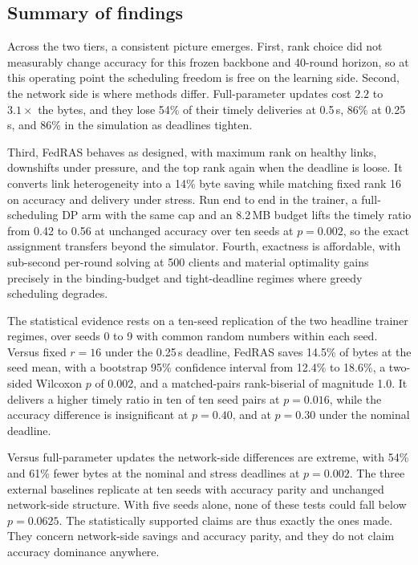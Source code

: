 \documentclass[preprint,12pt]{elsarticle}
\begin{document}
\subsection{Summary of findings}
\label{sec:summary}
Across the two tiers, a consistent picture emerges. First, rank choice did not measurably change accuracy for this frozen backbone and 40-round horizon, so at this operating point the scheduling freedom is free on the learning side. Second, the network side is where methods differ. Full-parameter updates cost $2.2$ to $3.1\times$ the bytes, and they lose 54\% of their timely deliveries at 0.5\,s, 86\% at 0.25\,s, and 86\% in the simulation as deadlines tighten.

Third, FedRAS behaves as designed, with maximum rank on healthy links, downshifts under pressure, and the top rank again when the deadline is loose. It converts link heterogeneity into a 14\% byte saving while matching fixed rank 16 on accuracy and delivery under stress. Run end to end in the trainer, a full-scheduling DP arm with the same cap and an 8.2\,MB budget lifts the timely ratio from 0.42 to 0.56 at unchanged accuracy over ten seeds at $p=0.002$, so the exact assignment transfers beyond the simulator. Fourth, exactness is affordable, with sub-second per-round solving at 500 clients and material optimality gains precisely in the binding-budget and tight-deadline regimes where greedy scheduling degrades.

The statistical evidence rests on a ten-seed replication of the two headline trainer regimes, over seeds 0 to 9 with common random numbers within each seed. Versus fixed $r{=}16$ under the 0.25\,s deadline, FedRAS saves 14.5\% of bytes at the seed mean, with a bootstrap 95\% confidence interval from 12.4\% to 18.6\%, a two-sided Wilcoxon $p$ of 0.002, and a matched-pairs rank-biserial of magnitude 1.0. It delivers a higher timely ratio in ten of ten seed pairs at $p=0.016$, while the accuracy difference is insignificant at $p=0.40$, and at $p=0.30$ under the nominal deadline.

Versus full-parameter updates the network-side differences are extreme, with 54\% and 61\% fewer bytes at the nominal and stress deadlines at $p=0.002$. The three external baselines replicate at ten seeds with accuracy parity and unchanged network-side structure. With five seeds alone, none of these tests could fall below $p=0.0625$. The statistically supported claims are thus exactly the ones made. They concern network-side savings and accuracy parity, and they do not claim accuracy dominance anywhere.
\end{document}
